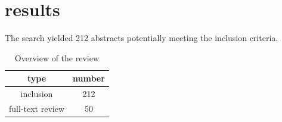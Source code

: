 \documentclass[a4paper, 12pt, twoside]{article}
\begin{document}
\section{results}%
\label{sec:results}
The search yielded 212 abstracts potentially meeting the inclusion criteria.

\begin{table}
	\centering
	\label{tab:overview_of_the_review}
	\begin{tabular}{c S}
		\toprule
		type             & {number} \\
		\midrule
		inclusion        & 212      \\
		full-text review & 50       \\
		\bottomrule
	\end{tabular}
	\caption{Overview of the review}
\end{table}

\appendix
\printglossaries
\printnomenclature


\end{document}
